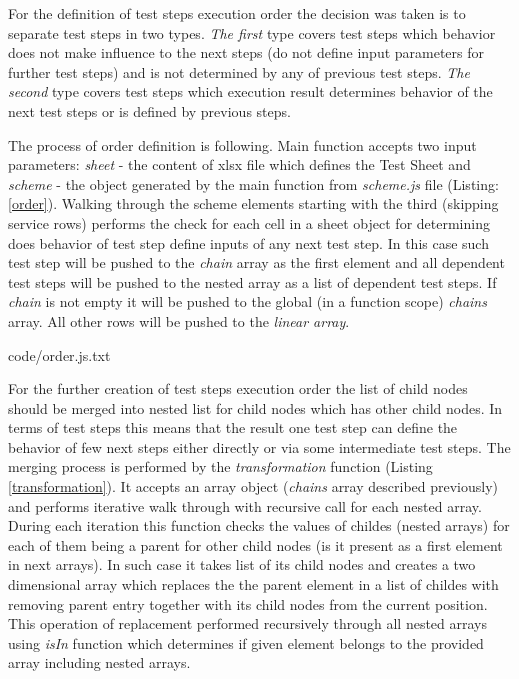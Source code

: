 For the definition of test steps execution order the decision was taken is to separate test steps in two types. \textit{The first} type covers test steps which behavior does not make influence to the next steps (do not define input parameters for further test steps) and is not determined by any of previous test steps. \textit{The second} type covers test steps which execution result determines behavior of the next test steps or is defined by previous steps.

%
The process of order definition is following. Main function accepts two input parameters: \textit{sheet} - the content of xlsx file which defines the Test Sheet and \textit{scheme} - the object generated by the main function from \textit{scheme.js} file (Listing: \ref{order}). Walking through the scheme elements starting with the third (skipping service rows) performs the check for each cell in a sheet object for determining does behavior of test step define inputs of any next test step. In this case such test step will be pushed to the \textit{chain} array as the first element and all dependent test steps will be pushed to the nested array as a list of dependent test steps. If \textit{chain} is not empty it will be pushed to the global (in a function scope) \textit{chains}  array. All other rows will be pushed to the \textit{linear array}.



{code/order.js.txt}

For the further creation of test steps execution order the list of child nodes should be merged into nested list for child nodes which has other child nodes. In terms of test steps this means that the result one test step can define the behavior of few next steps either directly or via some intermediate test steps. 
The merging process is performed by the \textit{transformation} function (Listing \ref{transformation}). It accepts an array object (\textit{chains} array described previously) and performs iterative walk through with recursive call for each nested array. During each iteration this function checks the values of childes (nested arrays) for each of them being a parent for other child nodes (is it present as a first element in next arrays). In such case it takes list of its child nodes and creates a two dimensional array which replaces the the parent element in a list of childes with removing parent entry together with its child nodes from the current position. This operation of replacement performed recursively through all nested arrays using \textit{isIn} function which determines if given element belongs to the provided array including nested arrays.

